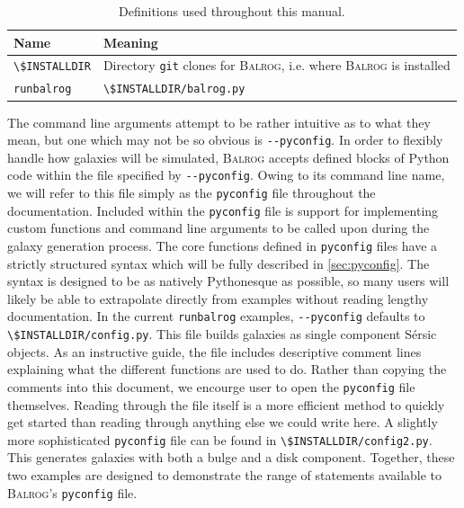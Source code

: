 \documentclass[12pt]{book}
\newcommand{\codett}[1]{\lstinline{#1}}
\newcommand{\py}{Python}
\newcommand{\pyconfig}{\codett{pyconfig}}
\newcommand{\balrog}{\textsc{Balrog}}
\newcommand{\opt}[1]{\codett{--#1}}
\newcommand{\sersic}{S\'{e}rsic}
\begin{document}
\begin{table}
\caption{Definitions used throughout this manual.}
\label{tab:def}
\begin{tabular}{l l}
\toprule \toprule
\textbf{Name} & \textbf{Meaning} \\ \midrule
\codett{\$INSTALLDIR} & Directory \codett{git} clones for \balrog{}, i.e. where \balrog{} is installed \\
\codett{runbalrog} & \codett{\$INSTALLDIR/balrog.py} \\ \bottomrule \bottomrule
\end{tabular}
\end{table}

The command line arguments attempt to be rather intuitive as to what they mean,
but one which may not be so obvious is \opt{pyconfig}.
In order to flexibly handle how galaxies will be simulated, \balrog{} accepts defined blocks of \py{} code
within the file specified by \opt{pyconfig}.
Owing to its command line name, we will refer to this file simply as the \pyconfig{} file
throughout the documentation.
Included within the \pyconfig{} file is support for implementing custom functions 
and command line arguments to be called upon during the galaxy generation process.
The core functions defined in \pyconfig{} files have a strictly
structured syntax which will be fully described in \autoref{sec:pyconfig}. 
The syntax is designed to be as natively \py esque as possible, so
many users will likely be able to extrapolate directly from examples without reading lengthy documentation. 
In the current \codett{runbalrog} examples, \opt{pyconfig} defaults to \codett{\$INSTALLDIR/config.py}.
This file builds galaxies as single component \sersic{} objects.
As an instructive guide, the file includes descriptive comment lines explaining what the different functions are used to do.
Rather than copying the comments into this document, we encourge user to open the \pyconfig{} file themselves.
Reading through the file itself is a more efficient method to quickly get started than
reading through anything else we could write here.
A slightly more sophisticated \pyconfig{} file can be found in \codett{\$INSTALLDIR/config2.py}.
This generates galaxies with both a bulge and a disk component.
Together, these two examples are designed to demonstrate the range of statements available to 
\balrog{}'s \pyconfig{} file.
\end{document}
